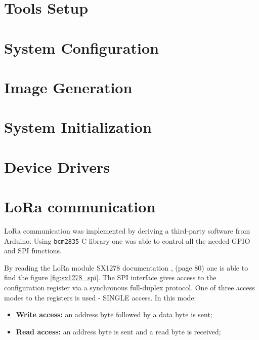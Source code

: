\section{Tools Setup}


\clearpage
\section{System Configuration}


\clearpage
\section{Image Generation}


\section{System Initialization}


\clearpage
\section{Device Drivers}


\clearpage
\section{LoRa communication}
LoRa communication was implemented by deriving a third-party software from Arduino. \cite{sx1278_lib} Using \verb|bcm2835| C library one was able to control all the needed GPIO and SPI functions. \cite{bcm2835} \cite{bcmspi}

By reading the LoRa module SX1278 documentation \cite{sx1278}, (page 80) one is able to find the figure \ref{fig:sx1278_spi}. The SPI interface gives access to the configuration register via a synchronous full-duplex protocol. One of three access modes to the registers is used - SINGLE access. In this mode:
\begin{itemize}
	\item \textbf{Write access:} an address byte followed by a data byte is sent;
	\item \textbf{Read access:} an address byte is sent and a read byte is received;
\end{itemize}

